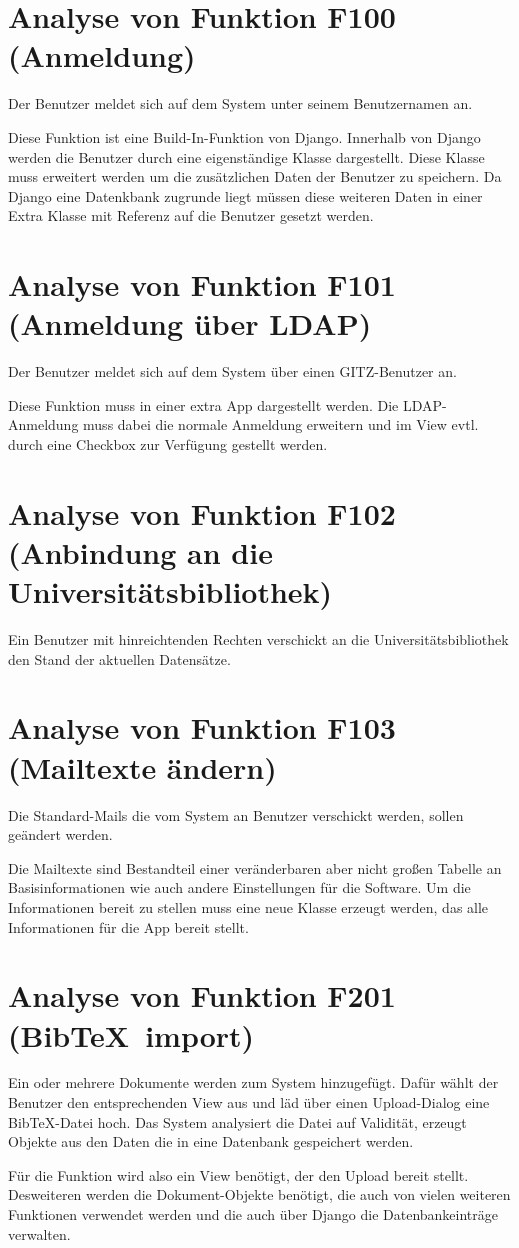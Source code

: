 \section{Analyse von Funktion F100 (Anmeldung)}
Der Benutzer meldet sich auf dem System unter seinem Benutzernamen an.

Diese Funktion ist eine Build-In-Funktion von Django. Innerhalb von Django
werden die Benutzer durch eine eigenständige Klasse dargestellt. Diese Klasse
muss erweitert werden um die zusätzlichen Daten der Benutzer zu speichern. Da
Django eine Datenkbank zugrunde liegt müssen diese weiteren Daten in einer Extra
Klasse mit Referenz auf die Benutzer gesetzt werden.

\section{Analyse von Funktion F101 (Anmeldung über LDAP)}
Der Benutzer meldet sich auf dem System über einen GITZ-Benutzer an.

Diese Funktion muss in einer extra App dargestellt werden. Die LDAP-Anmeldung
muss dabei die normale Anmeldung erweitern und im View evtl. durch eine Checkbox
zur Verfügung gestellt werden.

\section{Analyse von Funktion F102 (Anbindung an die Universitätsbibliothek)}
Ein Benutzer mit hinreichtenden Rechten verschickt an die Universitätsbibliothek
den Stand der aktuellen Datensätze.

\section{Analyse von Funktion F103 (Mailtexte ändern)}
Die Standard-Mails die vom System an Benutzer verschickt werden, sollen geändert
werden.

Die Mailtexte sind Bestandteil einer veränderbaren aber nicht großen Tabelle an
Basisinformationen wie auch andere Einstellungen für die Software. Um die
Informationen bereit zu stellen muss eine neue Klasse erzeugt werden, das alle
Informationen für die App bereit stellt.

\section{Analyse von Funktion F201 (Bib\TeX\ import)}
Ein oder mehrere Dokumente werden zum System hinzugefügt. Dafür wählt der
Benutzer den entsprechenden View aus und läd über einen Upload-Dialog eine
Bib\TeX -Datei hoch. Das System analysiert die Datei auf Validität, erzeugt
Objekte aus den Daten die in eine Datenbank gespeichert werden.

Für die Funktion wird also ein View benötigt, der den Upload bereit stellt.
Desweiteren werden die Dokument-Objekte benötigt, die auch von vielen weiteren
Funktionen verwendet werden und die auch über Django die Datenbankeinträge
verwalten.
